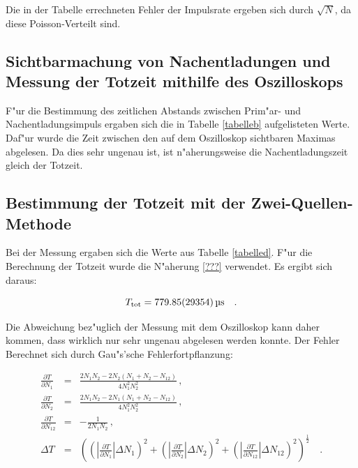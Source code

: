 	Die in der Tabelle errechneten Fehler der Impulsrate ergeben sich durch $\sqrt{N}$, da diese Poisson-Verteilt sind.

	\subsection{Sichtbarmachung von Nachentladungen und Messung der Totzeit mithilfe des Oszilloskops} %
	 \label{sub:sichtbarmachung_von_nachentladungen}

	
	
	F"ur die Bestimmung des zeitlichen Abstands zwischen Prim"ar- und Nachentladungsimpuls ergaben sich die in Tabelle \ref{tabelleb} aufgelisteten Werte. Daf"ur wurde die Zeit zwischen den auf dem Oszilloskop sichtbaren Maximas abgelesen.
	Da dies sehr ungenau ist, ist n"aherungsweise die Nachentladungszeit gleich der Totzeit.

	\subsection{Bestimmung der Totzeit mit der Zwei-Quellen-Methode} %
	\label{sub:bestimmung_der_totzeit_mit_der_zwei_quellen_methode}
	
	

	Bei der Messung ergaben sich die Werte aus Tabelle \ref{tabelled}.
	F"ur die Berechnung der Totzeit wurde die N"aherung \eqref{???} verwendet.
	Es ergibt sich daraus:

	\begin{equation*}
		T_\mathrm{tot} = \SI{779.85 (29354)}{\micro\second} \quad .
	\end{equation*}

	Die Abweichung bez"uglich der Messung mit dem Oszilloskop kann daher kommen, dass wirklich nur sehr ungenau abgelesen werden konnte.
	Der Fehler Berechnet sich durch Gau"s'sche Fehlerfortpflanzung:

	\begin{eqnarray*}
		\frac{\partial T}{\partial N_\mathrm{1}} &=& \frac{2 N_\mathrm{1}N_\mathrm{2} - 2 N_\mathrm{2}(N_\mathrm{1} + N_\mathrm{2} - N_\mathrm{12})}{4N_\mathrm{1}^2N_\mathrm{2}^2} \, , \\
		\frac{\partial T}{\partial N_\mathrm{2}} &=& \frac{2 N_\mathrm{1}N_\mathrm{2} - 2 N_\mathrm{1}(N_\mathrm{1} + N_\mathrm{2} - N_\mathrm{12})}{4N_\mathrm{1}^2N_\mathrm{2}^2} \, ,\\
		\frac{\partial T}{\partial N_\mathrm{12}} &=& -\frac{1}{2 N_\mathrm{1} N_\mathrm{2}} \, ,\\
		\Delta T &=& \left( \left( |\frac{\partial T}{\partial N_\mathrm{1}}| \Delta N_\mathrm{1} \right)^2 + \left( |\frac{\partial T}{\partial N_\mathrm{2}}| \Delta N_\mathrm{2} \right)^2 + \left( |\frac{\partial T}{\partial N_\mathrm{12}}| \Delta N_\mathrm{12} \right)^2 \right)^\frac{1}{2} \quad .
	\end{eqnarray*}